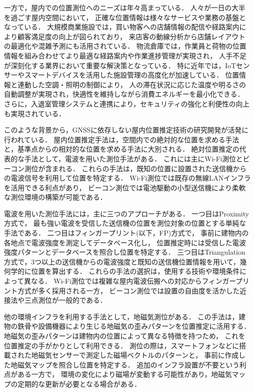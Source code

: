 一方で，屋内での位置測位へのニーズは年々高まっている．
人々が一日の大半を過ごす屋内空間において，
正確な位置情報は様々なサービスや業務の基盤となっている．
大規模商業施設では，買い物客への店舗情報の配信や経路案内により顧客満足度の向上が図られており\cite{burasapo}，
来店客の動線分析から店舗レイアウトの最適化や混雑予測にも活用されている．
物流倉庫では，作業員と荷物の位置情報を組み合わせてより最適な経路案内や作業進捗管理が実現され，
人手不足が深刻化する業界において重要な解決策となっている．
特に近年では，IoTセンサーやスマートデバイスを活用した施設管理の高度化が加速している．
位置情報と連動した空調・照明の制御により，
人の滞在状況に応じた温度や明るさの自動調整が実現され，快適性を維持しながら消費エネルギーを最小化できる．
さらに，入退室管理システムと連携により，セキュリティの強化と利便性の向上も実現されている．

このような背景から，GNSSに依存しない屋内位置推定技術の研究開発が活発に行われている．
屋内位置推定手法は，空間内での絶対的な位置を求める手法と，基準点からの相対的な位置を求める手法に大別される．
絶対位置推定の代表的な手法として，電波を用いた測位手法がある．
これには主にWi-Fi測位とビーコン測位が含まれる．
これらの手法は，既知の位置に設置された送信機からの電波信号を利用して位置を特定する．
Wi-Fi測位では既存の無線LANインフラを活用できる利点があり，
ビーコン測位では電池駆動の小型送信機により柔軟な測位環境の構築が可能である．

電波を用いた測位手法には，主に三つのアプローチがある．
一つ目はProximity方式で，
最も強い電波を受信した送信機の位置を測位対象の位置とする単純な手法である．
二つ目はフィンガープリント(以下，FP)方式で，
事前に建物内の各地点で電波強度を測定してデータベース化し，
位置推定時には受信した電波強度パターンとデータベースを照合し位置を特定する．
三つ目はTriangulation方式で，3つ以上の送信機からの電波強度と既知の送信機位置情報を用いて，幾何学的に位置を算出する．
これらの手法の選択は，使用する技術や環境条件によって異なる．
Wi-Fi測位では複雑な屋内電波伝搬への対応からフィンガープリント方式が多く採用される一方，
ビーコン測位では設置の自由度を活かした近接法や三点測位が一般的である．

他の環境インフラを利用する手法として，地磁気測位がある．
この手法は，建物の鉄骨や設備機器により生じる地磁気の歪みパターンを位置推定に活用する．
地磁気の歪みパターンは建物内の位置によって異なる特徴を持つため，
これを位置推定の手がかりとして利用できる．
測位の際は，スマートフォンなどに搭載された地磁気センサーで測定した磁場ベクトルのパターンと，
事前に作成した地磁気マップを照合し位置を特定する．
追加のインフラ設置が不要という利点がある一方で，
環境の変化により磁場が変動する可能性があり，地磁気マップの定期的な更新が必要となる場合がある．

